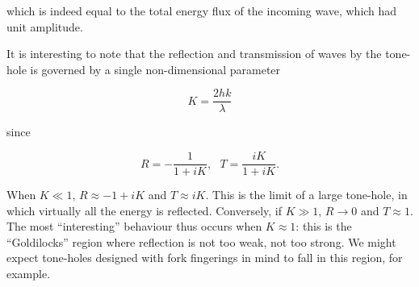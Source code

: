   \noindent{}which is indeed equal to the total energy flux of the incoming 
  wave, which had unit amplitude. 

  It is interesting to note that the reflection and transmission of waves by 
  the tone-hole is governed by a single non-dimensional parameter 

  \begin{equation*}K=\dfrac{2hk}{\lambda} \tag{13}\end{equation*} 

  \noindent{}since 

  \begin{equation*}R=-\dfrac{1}{1+iK}, \mathrm{~~~}T=\dfrac{iK}{1+iK} . 
  \tag{14}\end{equation*} 

  When $K \ll 1$, $R \approx -1+iK$ and $T \approx iK$. This is the limit of a 
  large tone-hole, in which virtually all the energy is reflected. Conversely, 
  if $K \gg 1$, $R \rightarrow 0$ and $T \approx 1$. The most ``interesting'' 
  behaviour thus occurs when $K \approx 1$: this is the ``Goldilocks'' region 
  where reflection is not too weak, not too strong. We might expect tone-holes 
  designed with fork fingerings in mind to fall in this region, for example. 